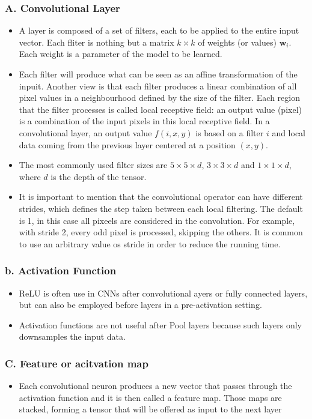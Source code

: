 \documentclass{report}
\begin{document}
\subsubsection*{A. Convolutional Layer}
\begin{itemize}
    \item A layer is composed of a set of filters, each to be applied to the entire input vector. Each fliter is nothing but a matrix $k \times k$ of weights (or values) $\mathbf{w}_i$. Each weight is a parameter of the model to be learned.
    \item Each filter will produce what can be seen as an affine transformation of the inpuit. Another view is that each filter produces a linear combination of all pixel values in a neighbourhood defined by the size of the filter. Each region that the filter processes is called local receptive field: an output value (pixel) is a combination of the input pixels in this local receptive field. In a convolutional layer, an output value $f(i, x, y)$ is based on a filter $i$ and local data coming from the previous layer centered at a position $(x, y)$.
    \item The most commonly used filter sizes are $5 \times 5 \times d$, $3 \times 3 \times d$ and $1 \times 1 \times d$, where $d$ is the depth of the tensor.
    \item It is important to mention that the convolutional operator can have different strides, which defines the step taken between each local filtering. The default is 1, in this case all pixeels are considered in the convolution. For example, with stride 2, every odd pixel is processed, skipping the others. It is common to use an arbitrary value os stride in order to reduce the running time. 
\end{itemize}
\subsubsection*{b. Activation Function}
\begin{itemize}
    \item ReLU is often use in CNNs after convolutional ayers or fully connected layers, but can also be employed before layers in a pre-activation setting.
    \item Activation functions are not useful after Pool layers because such layers only downsamples the input data.
\end{itemize}
\subsubsection*{C. Feature or acitvation map}
\begin{itemize}
    \item Each convolutional neuron produces a new vector that passes through the activation function and it is then called a feature map. Those maps are stacked, forming a tensor that will be offered as input to the next layer
\end{itemize}
\end{document}
